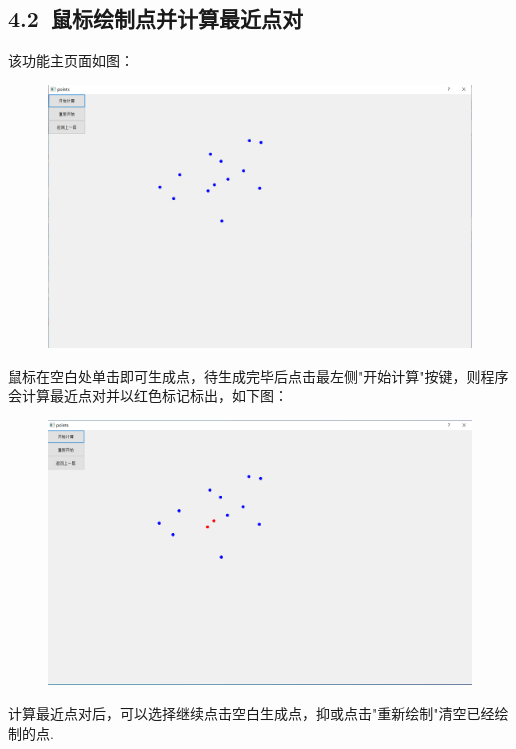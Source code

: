 \documentclass[UTF8]{ctexart}
\begin{document}
\subsection*{4.2\ 鼠标绘制点并计算最近点对}
该功能主页面如图：
\begin{figure}[H]\begin{center}
	\includegraphics[scale = 0.5]{2.png}
\end{center}\end{figure}\par
鼠标在空白处单击即可生成点，待生成完毕后点击最左侧"开始计算"按键，则程序会计算最近点对并以红色标记标出，如下图：
\begin{figure}[H]\begin{center}
	\includegraphics[scale = 0.5]{3.png}
\end{center}\end{figure}\par
计算最近点对后，可以选择继续点击空白生成点，抑或点击"重新绘制"清空已经绘制的点.
\end{document}
